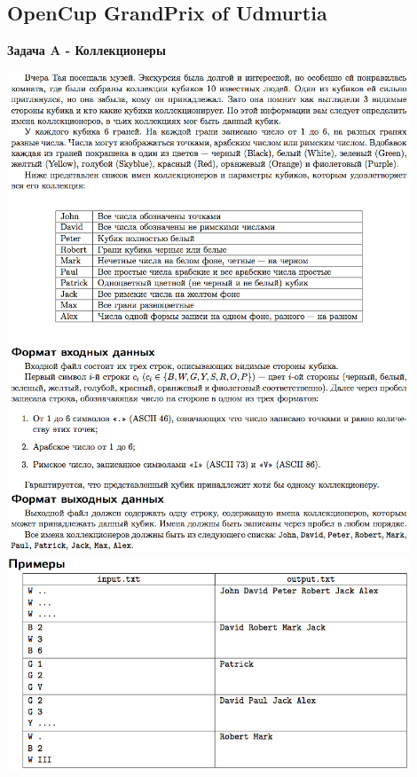 \documentclass[a4paper,12pt]{article}
\begin{document}
%
%
\newpage
\subsection{OpenCup GrandPrix of Udmurtia}

\textbf{{\large Задача A - Коллекционеры}} \\
\begin{center}
\includegraphics[width=0.9\textwidth]{OC_Udmurtia/OC_Udmurtia_A1.png}\\ [1cm]
\includegraphics[width=0.9\textwidth]{OC_Udmurtia/OC_Udmurtia_A2.png}\\ [1cm]
\end{center}
\newpage
\end{document}
